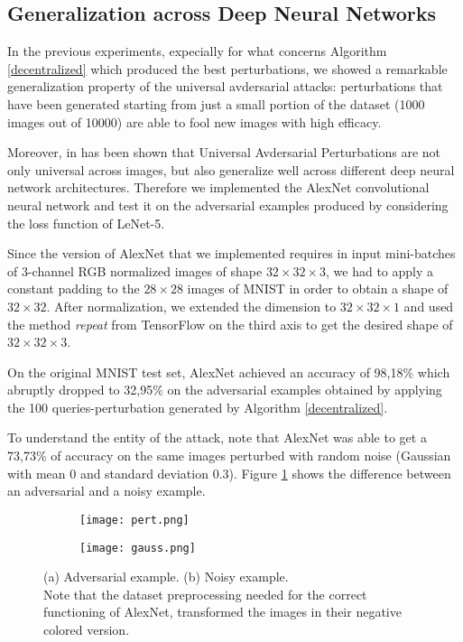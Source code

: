 \subsection{Generalization across Deep Neural Networks}
In the previous experiments, expecially for what concerns Algorithm \ref{decentralized} which produced the best perturbations, we showed a remarkable generalization property of the universal avdersarial attacks: perturbations that have been generated starting from just a small portion of the dataset (1000 images out of 10000) are able to fool new images with high efficacy.

Moreover, in \cite{A2} has been shown that Universal Avdersarial Perturbations are not only universal across images, but also generalize well across different deep neural network architectures. Therefore we implemented the AlexNet convolutional neural network and test it on the adversarial examples produced by considering the loss function of LeNet-5.

Since the version of AlexNet that we implemented requires in input mini-batches of 3-channel RGB normalized images of shape $32\times 32\times 3$, we had to apply a constant padding to the $28\times 28$ images of MNIST in order to obtain a shape of $32\times 32$. After normalization, we extended the dimension to $32\times 32\times 1$ and used the method \textit{repeat} from TensorFlow on the third axis to get the desired shape of $32\times 32\times 3$. 

On the original MNIST test set, AlexNet achieved an accuracy of 98,18\% which abruptly dropped to 32,95\% on the adversarial examples obtained by applying the 100 queries-perturbation generated by Algorithm \ref{decentralized}.

To understand the entity of the attack, note that AlexNet was able to get a 73,73\% of accuracy on the same images perturbed with random noise (Gaussian with mean 0 and standard deviation 0.3). Figure \ref{fig:gen} shows the difference between an adversarial and a noisy example.

\begin{figure}[h]
	\centering
	\begin{subfigure}[b]{0.15\textwidth}
		\centering
		\texttt{[image: pert.png]}
		\caption{}
	\end{subfigure}
	\hspace{0.7cm}
	\begin{subfigure}[b]{0.15\textwidth}
		\texttt{[image: gauss.png]}
		\caption{}
	\end{subfigure}
	\caption{{\small (a) Adversarial example. (b) Noisy example.\\ Note that the dataset preprocessing needed for the correct functioning of AlexNet, transformed the images in their negative colored version.}}
	\label{fig:gen}
\end{figure}